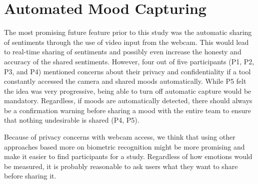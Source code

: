 \section{Automated Mood Capturing}
The most promising future feature prior to this study was the automatic sharing of sentiments through the use of video input from the webcam. This would lead to real-time sharing of sentiments and possibly even increase the honesty and accuracy of the shared sentiments. However, four out of five participants (P1, P2, P3, and P4) mentioned concerns about their privacy and confidentiality if a tool constantly accessed the camera and shared moods automatically. While P5 felt the idea was very progressive, being able to turn off automatic capture would be mandatory. Regardless, if moods are automatically detected, there should always be a confirmation warning before sharing a mood with the entire team to ensure that nothing undesirable is shared (P4, P5).

Because of privacy concerns with webcam access, we think that using other approaches based more on biometric recognition might be more promising and make it easier to find participants for a study. Regardless of how emotions would be measured, it is probably reasonable to ask users what they want to share before sharing it.